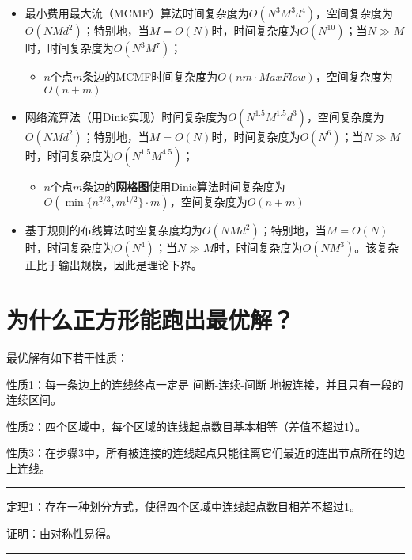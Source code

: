\documentclass[]{article}
\begin{document}
\begin{itemize}
\item
  最小费用最大流（MCMF）算法时间复杂度为\(O(N^3M^3d^4)\)，空间复杂度为\(O(NMd^2)\)；特别地，当\(M=O(N)\)时，时间复杂度为\(O(N^{10})\)；当\(N\gg M\)时，时间复杂度为\(O(N^3M^7)\)；

  \begin{itemize}
  \item
    \(n\)个点\(m\)条边的MCMF时间复杂度为\(O(nm\cdot MaxFlow)\)，空间复杂度为\(O(n+m)\)
  \end{itemize}
\item
  网络流算法（用Dinic实现）时间复杂度为\(O(N^{1.5}M^{1.5}d^3)\)，空间复杂度为\(O(NMd^2)\)；特别地，当\(M=O(N)\)时，时间复杂度为\(O(N^{6})\)；当\(N\gg M\)时，时间复杂度为\(O(N^{1.5}M^{4.5})\)；

  \begin{itemize}
  \item
    \(n\)个点\(m\)条边的\textbf{网格图}使用Dinic算法时间复杂度为\(O(\min\{n^{2/3},m^{1/2}\}\cdot m)\)，空间复杂度为\(O(n+m)\)
  \end{itemize}
\item
  基于规则的布线算法时空复杂度均为\(O(NMd^2)\)；特别地，当\(M=O(N)\)时，时间复杂度为\(O(N^4)\)；当\(N\gg M\)时，时间复杂度为\(O(NM^3)\)。该复杂正比于输出规模，因此是理论下界。
\end{itemize}

\section{为什么正方形能跑出最优解？}\label{header-n749}

最优解有如下若干性质：

性质1：每一条边上的连线终点一定是 间断-连续-间断
地被连接，并且只有一段的连续区间。

性质2：四个区域中，每个区域的连线起点数目基本相等（差值不超过1）。

性质3：在步骤3中，所有被连接的连线起点只能往离它们最近的连出节点所在的边上连线。

\begin{center}\rule{0.5\linewidth}{\linethickness}\end{center}

定理1：存在一种划分方式，使得四个区域中连线起点数目相差不超过1。

证明：由对称性易得。

\begin{center}\rule{0.5\linewidth}{\linethickness}\end{center}
\end{document}
